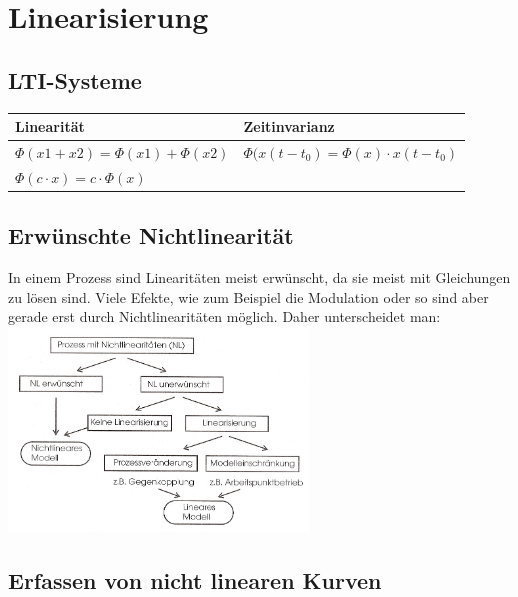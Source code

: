 \section{Linearisierung}
	\subsection{LTI-Systeme}
	  	\renewcommand{\arraystretch}{1.5}
		\begin{tabular}{|l|l|}
	    	\hline
	    	\textbf{Linearität} & \textbf{Zeitinvarianz}\\
	    	\hline
	    	$\Phi(x1+x2)=\Phi(x1)+\Phi(x2)$ & $\Phi(x(t-t_0)=\Phi(x)\cdot x(t-t_0)$ \\
	    	$\Phi(c\cdot x)=c\cdot \Phi(x)$ & \\
			\hline    
	    \end{tabular}
	  	\renewcommand{\arraystretch}{1}
	  	
	\subsection{Erwünschte Nichtlinearität}
		In einem Prozess sind Linearitäten meist erwünscht, da sie meist mit
		Gleichungen zu lösen sind.
		Viele Efekte, wie zum Beispiel die Modulation oder so sind aber gerade erst
		durch Nichtlinearitäten möglich. Daher unterscheidet man:\\
	\includegraphics[width=8cm]{./bilder/Liste_Nichtlinearitaeten.jpg}


	\subsection{Erfassen von nicht linearen Kurven}
